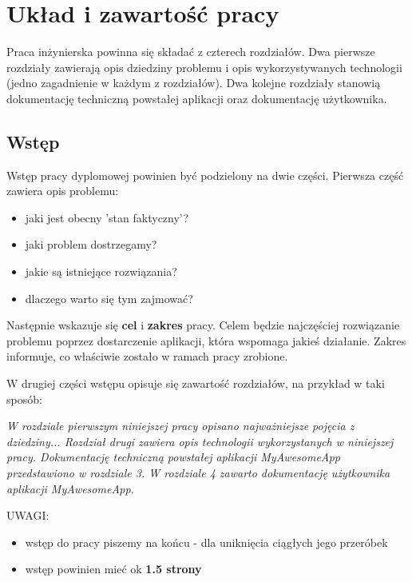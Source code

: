 \chapter{Układ i zawartość pracy}\label{chap:introduction}
Praca inżynierska powinna się składać z czterech rozdziałów. Dwa pierwsze rozdziały zawierają opis dziedziny problemu i opis wykorzystywanych technologii (jedno zagadnienie w każdym z rozdziałów). Dwa kolejne rozdziały stanowią dokumentację techniczną powstałej aplikacji oraz dokumentację użytkownika.

\section{Wstęp}
Wstęp pracy dyplomowej powinien być podzielony na dwie części. Pierwsza część zawiera opis problemu:
\begin{itemize}
\item jaki jest obecny 'stan faktyczny'? 
\item jaki problem dostrzegamy?
\item jakie są istniejące rozwiązania?
\item dlaczego warto się tym zajmować?
\end{itemize}

Następnie wskazuje się \textbf{cel} i \textbf{zakres} pracy. Celem będzie najczęściej rozwiązanie problemu poprzez dostarczenie aplikacji, która wspomaga jakieś działanie. Zakres informuje, co właściwie zostało w ramach pracy zrobione.

W drugiej części wstępu opisuje się zawartość rozdziałów, na przykład w taki sposób:

\emph{
W rozdziale pierwszym niniejszej pracy opisano najważniejsze pojęcia z dziedziny...
Rozdział drugi zawiera opis technologii wykorzystanych w niniejszej pracy.
Dokumentację techniczną powstałej aplikacji MyAwesomeApp przedstawiono w rozdziale 3. W rozdziale 4 zawarto dokumentację użytkownika aplikacji MyAwesomeApp.}

UWAGI:
\begin{itemize}
\item wstęp do pracy piszemy na końcu - dla uniknięcia ciągłych jego przeróbek
\item wstęp powinien mieć ok \textbf{1.5 strony}
\end{itemize}

